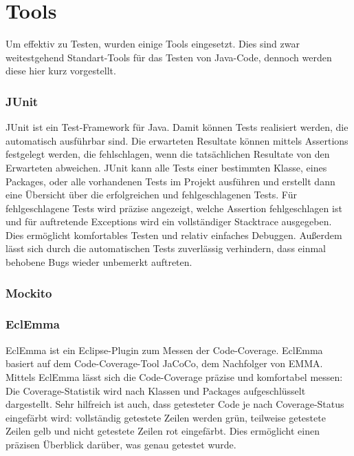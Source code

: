\part{Tools}
Um effektiv zu Testen, wurden einige Tools eingesetzt. Dies sind zwar weitestgehend Standart-Tools für das Testen von Java-Code, dennoch werden diese hier kurz vorgestellt.

\section{JUnit}
JUnit ist ein Test-Framework für Java.
Damit können Tests realisiert werden, die automatisch ausführbar sind.
Die erwarteten Resultate können mittels Assertions festgelegt werden, die fehlschlagen, wenn die tatsächlichen Resultate von den Erwarteten abweichen.
JUnit kann alle Tests einer bestimmten Klasse, eines Packages, oder alle vorhandenen Tests im Projekt ausführen und erstellt dann eine Übersicht über die erfolgreichen und fehlgeschlagenen Tests.
Für fehlgeschlagene Tests wird präzise angezeigt, welche Assertion fehlgeschlagen ist und für auftretende Exceptions wird ein vollständiger Stacktrace ausgegeben.
Dies ermöglicht komfortables Testen und relativ einfaches Debuggen.
Außerdem lässt sich durch die automatischen Tests zuverlässig verhindern, dass einmal behobene Bugs wieder unbemerkt auftreten. 

\section{Mockito}

\section{EclEmma}
EclEmma ist ein Eclipse-Plugin zum Messen der Code-Coverage.
EclEmma basiert auf dem Code-Coverage-Tool JaCoCo, dem Nachfolger von EMMA.
Mittels EclEmma lässt sich die Code-Coverage präzise und komfortabel messen:
Die Coverage-Statistik wird nach Klassen und Packages aufgeschlüsselt dargestellt.
Sehr hilfreich ist auch, dass getesteter Code je nach Coverage-Status eingefärbt wird: vollständig getestete Zeilen werden grün, teilweise getestete Zeilen gelb und nicht getestete Zeilen rot eingefärbt.
Dies ermöglicht einen präzisen Überblick darüber, was genau getestet wurde.






